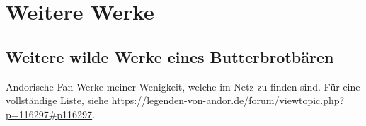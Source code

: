 

\part{Weitere Werke}

\fancyhead[L]{\nouppercase{\lastrightmark}}



\begin{chapterbox}
    \chapter{Weitere wilde Werke eines Butterbrotbären}
    \label{Weitere wilde Werke eines Butterbrotbären}
    Andorische Fan-Werke meiner Wenigkeit, welche im Netz zu finden sind. Für eine vollständige Liste, siehe \url{https://legenden-von-andor.de/forum/viewtopic.php?p=116297\#p116297}.
\end{chapterbox}




